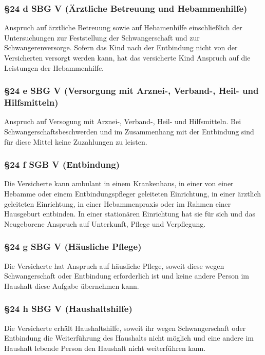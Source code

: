 \documentclass[a4paper, 12pt]{report}
\begin{document}
\subsubsection{\S 24 d SBG V (Ärztliche Betreuung und Hebammenhilfe)}

Anspruch auf ärztliche Betreuung sowie auf Hebamenhilfe einschließlich der 
Untersuchungen zur Feststellung der Schwangerschaft und zur Schwangerenversorge. 
Sofern das Kind nach der Entbindung nicht von der Versicherten versorgt werden 
kann, hat das versicherte Kind Anspruch auf die Leistungen der Hebammenhilfe. 

\subsubsection{\S 24 e SBG V (Versorgung mit Arznei-, Verband-, Heil- und 
Hilfsmitteln)}

Anspruch auf Versogung mit Arznei-, Verband-, Heil- und Hilfsmitteln. Bei 
Schwangerschaftsbeschwerden und im Zusammenhang mit der Entbindung sind für 
diese Mittel keine Zuzahlungen zu leisten. 

\subsubsection{\S 24 f SGB V (Entbindung)}

Die Versicherte kann ambulant in einem Krankenhaus, in einer von einer Hebamme 
oder einem Entbindungspfleger geleiteten Einrichtung, in einer ärztlich 
geleiteten Einrichtung, in einer Hebammenpraxis oder im Rahmen einer Hausgeburt 
entbinden. In einer stationären Einrichtung hat sie für sich und das 
Neugeborene Anspruch auf Unterkunft, Pflege und Verpflegung. 

\subsubsection{\S 24 g SBG V (Häusliche Pflege)}

Die Versicherte hat Anspruch auf häusliche Pflege, soweit diese wegen 
Schwangerschaft oder Entbindung erforderlich ist und keine andere Person im 
Haushalt diese Aufgabe übernehmen kann. 

\subsubsection{\S 24 h SBG V (Haushaltshilfe)}

Die Versicherte erhält Haushaltshilfe, soweit ihr wegen Schwangerschaft oder 
Entbindung die Weiterführung des Haushalts nicht möglich und eine andere im 
Haushalt lebende Person den Haushalt nicht weiterführen kann. 
\end{document}
